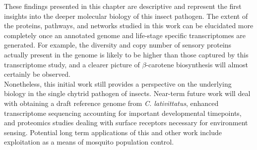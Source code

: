 \indent These findings presented in this chapter are descriptive and represent the first insights into the deeper molecular biology of this insect pathogen. The extent of the proteins, pathways, and networks studied in this work can be elucidated more completely once an annotated genome and life-stage specific transcriptomes are generated. For example, the diversity and copy number of sensory proteins actually present in the genome is likely to be higher than those captured by this transcriptome study, and a clearer picture of $\beta$-carotene biosynthesis will almost certainly be observed. \\
\indent Nonetheless, this initial work still provides a perspective on the underlying biology in the single chytrid pathogen of insects. Near-term future work will deal with obtaining a draft reference genome from \textit{C. lativittatus}, enhanced transcriptome sequencing accounting for important developmental timepoints, and proteomics studies dealing with surface receptors necessary for environment sensing. Potential long term applications of this and other work include exploitation as a means of mosquito population control. \\
